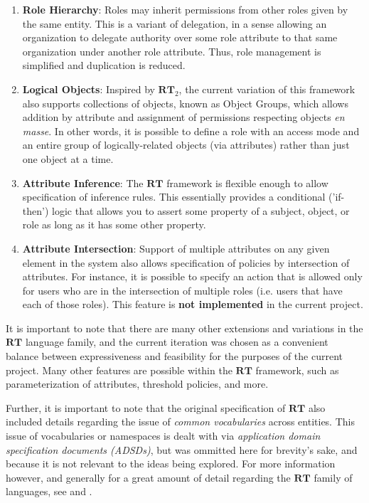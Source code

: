 \documentclass{article}
\providecommand{\RT}{\textbf{RT}}
\begin{document}
\begin{itemize}
\begin{enumerate}
    \item \textbf{Role Hierarchy}: Roles may inherit permissions from other roles given by the same entity. This is a variant of delegation, in a sense allowing an organization to delegate authority over some role attribute to that same organization under another role attribute. Thus, role management is simplified and duplication is reduced.
    \item \textbf{Logical Objects}: Inspired by $\RT_2$, the current variation of this framework also supports collections of objects, known as Object Groups, which allows addition by attribute and assignment of permissions respecting objects \textit{en masse}. In other words, it is possible to define a role with an access mode and an entire group of logically-related objects (via attributes) rather than just one object at a time.
    \item \textbf{Attribute Inference}: The $\RT$ framework is flexible enough to allow specification of inference rules. This essentially provides a conditional ('if-then') logic that allows you to assert some property of a subject, object, or role as long as it has some other property.
    \item \textbf{Attribute Intersection}: Support of multiple attributes on any given element in the system also allows specification of policies by intersection of attributes. For instance, it is possible to specify an action that is allowed only for users who are in the intersection of multiple roles (i.e. users that have each of those roles). This feature is \textbf{not implemented} in the current project.
  \end{enumerate}
\end{itemize}
It is important to note that there are many other extensions and variations in the $\RT$ language family, and the current iteration was chosen as a convenient balance between expressiveness and feasibility for the purposes of the current project. Many other features are possible within the $\RT$ framework, such as parameterization of attributes, threshold policies, and more. \par
Further, it is important to note that the original specification of $\RT$ also included details regarding the issue of \textit{common vocabularies} across entities. This issue of vocabularies or namespaces is dealt with via \textit{application domain specification documents (ADSDs)}, but was ommitted here for brevity's sake, and because it is not relevant to the ideas being explored. For more information however, and generally for a great amount of detail regarding the $\RT$ family of languages, see \cite{RTmain} and \cite{RTold}.
\end{document}
